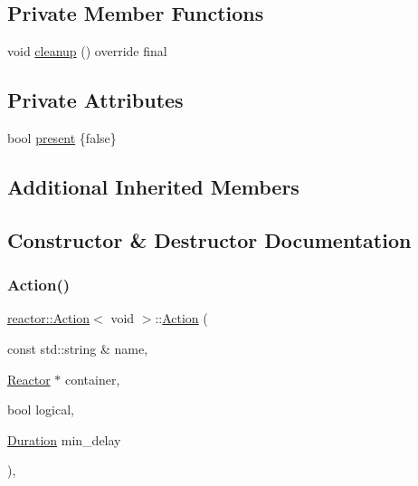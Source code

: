 \subsection*{Private Member Functions}
\begin{DoxyCompactItemize}
\item 
void \hyperlink{classreactor_1_1Action_3_01void_01_4_aa0306b1c370b15a324bac607e5f82f20}{cleanup} () override final
\end{DoxyCompactItemize}
\subsection*{Private Attributes}
\begin{DoxyCompactItemize}
\item 
bool \hyperlink{classreactor_1_1Action_3_01void_01_4_ad491b67ebfa70d65f04e6a0403a3cc51}{present} \{false\}
\end{DoxyCompactItemize}
\subsection*{Additional Inherited Members}


\subsection{Constructor \& Destructor Documentation}
\mbox{\label{classreactor_1_1Action_3_01void_01_4_a74b23c4d882b046dc8e9aaad11e10eab}} 
\subsubsection{\texorpdfstring{Action()}{Action()}}
{\footnotesize\ttfamily \hyperlink{classreactor_1_1Action}{reactor\+::\+Action}$<$ void $>$\+::\hyperlink{classreactor_1_1Action}{Action} (\begin{DoxyParamCaption}\item[{const std\+::string \&}]{name,  }\item[{\hyperlink{classreactor_1_1Reactor}{Reactor} $\ast$}]{container,  }\item[{bool}]{logical,  }\item[{\hyperlink{namespacereactor_aa8375b807a80703545664096c5b5b779}{Duration}}]{min\+\_\+delay }\end{DoxyParamCaption})\hspace{0.3cm}{\ttfamily [inline]}, {\ttfamily [protected]}}



